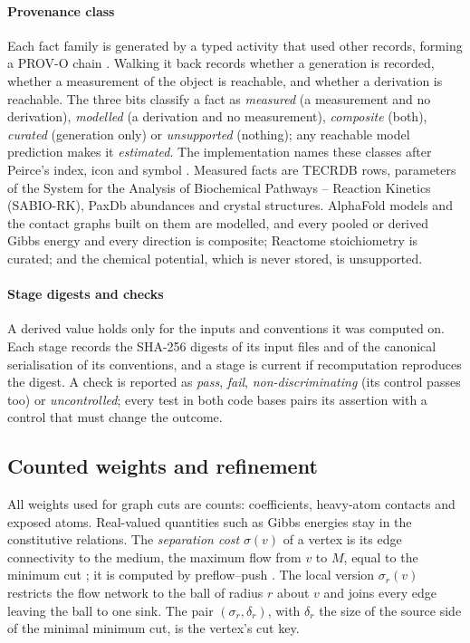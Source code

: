 \documentclass[5p]{elsarticle}
\theoremstyle{definition}
\theoremstyle{plain}
\begin{document}
\paragraph{Provenance class}
Each fact family is generated by a typed activity that used other records, forming a PROV-O chain \citep{lebo2013provo}.
Walking it back records whether a generation is recorded, whether a measurement of the object is reachable, and whether a derivation is reachable.
The three bits classify a fact as \emph{measured} (a measurement and no derivation), \emph{modelled} (a derivation and no measurement), \emph{composite} (both), \emph{curated} (generation only) or \emph{unsupported} (nothing); any reachable model prediction makes it \emph{estimated}.
The implementation names these classes after Peirce's index, icon and symbol \citep{peirce1932collected}.
Measured facts are TECRDB rows, parameters of the System for the Analysis of Biochemical Pathways -- Reaction Kinetics (SABIO-RK), PaxDb abundances and crystal structures.
AlphaFold models and the contact graphs built on them are modelled, and every pooled or derived Gibbs energy and every direction is composite; Reactome stoichiometry is curated; and the chemical potential, which is never stored, is unsupported.

\paragraph{Stage digests and checks}
A derived value holds only for the inputs and conventions it was computed on.
Each stage records the SHA-256 digests of its input files and of the canonical serialisation of its conventions, and a stage is current if recomputation reproduces the digest.
A check is reported as \emph{pass}, \emph{fail}, \emph{non-discriminating} (its control passes too) or \emph{uncontrolled}; every test in both code bases pairs its assertion with a control that must change the outcome.

\subsection{Counted weights and refinement}
\label{sec:cuts}

All weights used for graph cuts are counts: coefficients, heavy-atom contacts and exposed atoms.
Real-valued quantities such as Gibbs energies stay in the constitutive relations.
The \emph{separation cost} $\sigma(v)$ of a vertex is its edge connectivity to the medium, the maximum flow from $v$ to $M$, equal to the minimum cut \citep{ford1956maximal}; it is computed by preflow--push \citep{goldberg1988preflow}.
The local version $\sigma_r(v)$ restricts the flow network to the ball of radius $r$ about $v$ and joins every edge leaving the ball to one sink.
The pair $(\sigma_r,\delta_r)$, with $\delta_r$ the size of the source side of the minimal minimum cut, is the vertex's cut key.
\end{document}
